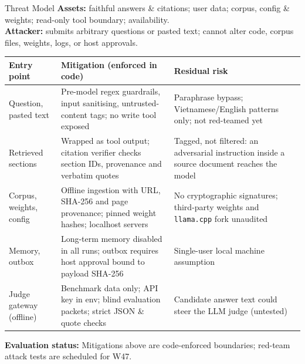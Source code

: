 \documentclass[aspectratio=1610,11pt]{beamer}
\renewcommand{\arraystretch}{1.15}
\begin{document}
\begin{frame}{Threat Model}
  \footnotesize
  \textbf{Assets:} faithful answers \& citations; user data; corpus, config \& weights; read-only tool boundary; availability.\\
  \textbf{Attacker:} submits arbitrary questions or pasted text; cannot alter code, corpus files, weights, logs, or host approvals.\\[3pt]
  \scriptsize\renewcommand{\arraystretch}{1.08}
  \begin{tabularx}{\textwidth}{@{}>{\raggedright\arraybackslash}p{2.8cm}>{\raggedright\arraybackslash}X>{\raggedright\arraybackslash}X@{}}
    \toprule Entry point & Mitigation (enforced in code) & Residual risk\\\midrule
    Question, pasted text & Pre-model regex guardrails, input sanitising, untrusted-content tags; no write tool exposed & Paraphrase bypass; Vietnamese/English patterns only; not red-teamed yet\\
    Retrieved sections & Wrapped as tool output; citation verifier checks section IDs, provenance and verbatim quotes & Tagged, not filtered: an adversarial instruction inside a source document reaches the model\\
    Corpus, weights, config & Offline ingestion with URL, SHA-256 and page provenance; pinned weight hashes; localhost servers & No cryptographic signatures; third-party weights and \texttt{llama.cpp} fork unaudited\\
    Memory, outbox & Long-term memory disabled in all runs; outbox requires host approval bound to payload SHA-256 & Single-user local machine assumption\\
    Judge gateway (offline) & Benchmark data only; API key in env; blind evaluation packets; strict JSON \& quote checks & Candidate answer text could steer the LLM judge (untested)\\
    \bottomrule
  \end{tabularx}
  \vspace{3pt}

  \footnotesize \textcolor{dangerred}{\textbf{Evaluation status:}} Mitigations above are code-enforced boundaries; red-team attack tests are scheduled for W47.
\end{frame}
\end{document}
